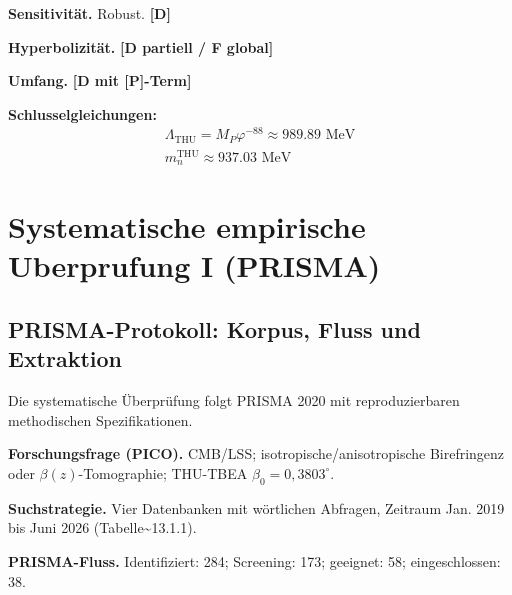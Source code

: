 ﻿\documentclass[11pt,letterpaper]{article}
\begin{document}
\textbf{Sensitivität.} Robust. \textbf{[D]}

\textbf{Hyperbolizität.} \textbf{[D partiell / F global]}

\textbf{Umfang.} \textbf{[D mit [P]-Term]}

\textbf{Schlusselgleichungen:}
\begin{align*}
    \Lambda_{\mathrm{THU}} = M_P \varphi^{-88} \approx 989.89 \text{ MeV} \\
    m_n^{\mathrm{THU}} \approx 937.03 \text{ MeV}
\end{align*}
\section{Systematische empirische Uberprufung I (PRISMA)}
\subsection{PRISMA-Protokoll: Korpus, Fluss und Extraktion}
Die systematische Überprüfung folgt PRISMA 2020 mit reproduzierbaren methodischen Spezifikationen.

\textbf{Forschungsfrage (PICO).} CMB/LSS; isotropische/anisotropische Birefringenz oder $\beta(z)$-Tomographie; THU-TBEA $\beta_0 = 0{,}3803^\circ$.

\textbf{Suchstrategie.} Vier Datenbanken mit wörtlichen Abfragen, Zeitraum Jan. 2019 bis Juni 2026 (Tabelle\textasciitilde{}13.1.1).

\begin{table}[htbp]
  \centering
  \small
  \caption{Datensätze pro Datenbank.}
\end{table}

\textbf{PRISMA-Fluss.} Identifiziert: 284; Screening: 173; geeignet: 58; eingeschlossen: 38.
\end{document}
